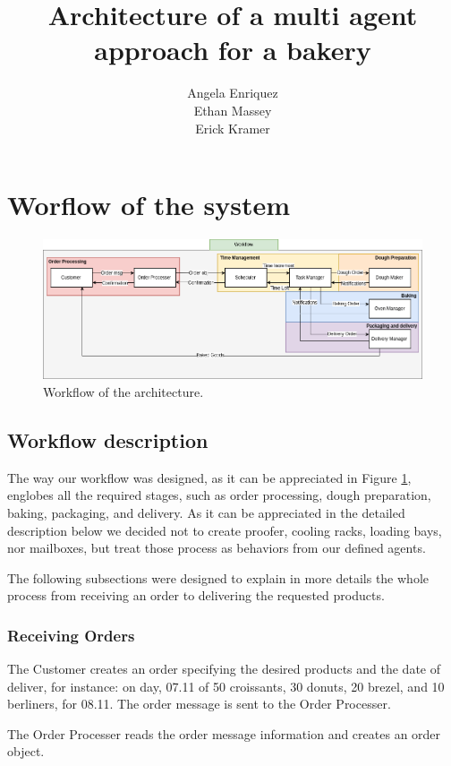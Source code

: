 \documentclass[a4paper]{article}
\title{Architecture of a multi agent approach for a bakery}
\author{Angela Enriquez\\
	    Ethan Massey\\
	    Erick Kramer}
\begin{document}
	\maketitle
	\newpage
	\section{Worflow of the system}
	
	\begin{figure}[h!]
		\includegraphics[scale=0.4]{img/architecture-workflow.png}
		\caption{Workflow of the architecture.}
		\label{fig: WF}
	\end{figure}
	
	\subsection{Workflow description}
	The way our workflow was designed, as it can be appreciated in Figure \ref{fig: WF}, englobes all the required stages, such as order processing, dough preparation, baking, packaging, and delivery. As it can be appreciated in the detailed description below we decided not to create proofer, cooling racks, loading bays, nor mailboxes, but treat those process as behaviors from our defined agents.
	
	The following subsections were designed to explain in more details the whole process from receiving an order to delivering the requested products.
	 
	\subsubsection{Receiving Orders}
	
	The Customer creates an order specifying the desired products and the date of deliver, for instance: on day, 07.11 of 50 croissants, 30 donuts, 20 brezel, and 10 berliners, for 08.11. The order message is sent to the Order Processer. 
	
	The Order Processer reads the order message information and creates an order object. 
	
\end{document}
